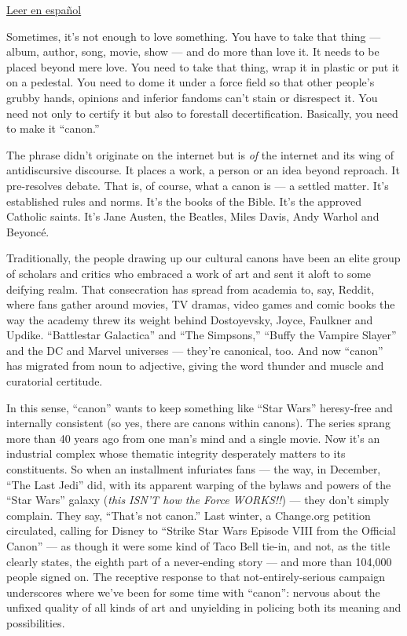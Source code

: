 \href{https://www.nytimes3xbfgragh.onion/es/2018/06/03/fanaticos-canon-arte/}{Leer
en español}

Sometimes, it's not enough to love something. You have to take that
thing --- album, author, song, movie, show --- and do more than love it.
It needs to be placed beyond mere love. You need to take that thing,
wrap it in plastic or put it on a pedestal. You need to dome it under a
force field so that other people's grubby hands, opinions and inferior
fandoms can't stain or disrespect it. You need not only to certify it
but also to forestall decertification. Basically, you need to make it
``canon.''

The phrase didn't originate on the internet but is \emph{of} the
internet and its wing of antidiscursive discourse. It places a work, a
person or an idea beyond reproach. It pre-resolves debate. That is, of
course, what a canon is --- a settled matter. It's established rules and
norms. It's the books of the Bible. It's the approved Catholic saints.
It's Jane Austen, the Beatles, Miles Davis, Andy Warhol and Beyoncé.

Traditionally, the people drawing up our cultural canons have been an
elite group of scholars and critics who embraced a work of art and sent
it aloft to some deifying realm. That consecration has spread from
academia to, say, Reddit, where fans gather around movies, TV dramas,
video games and comic books the way the academy threw its weight behind
Dostoyevsky, Joyce, Faulkner and Updike. ``Battlestar Galactica'' and
``The Simpsons,'' ``Buffy the Vampire Slayer'' and the DC and Marvel
universes --- they're canonical, too. And now ``canon'' has migrated
from noun to adjective, giving the word thunder and muscle and
curatorial certitude.

In this sense, ``canon'' wants to keep something like ``Star Wars''
heresy-free and internally consistent (so yes, there are canons within
canons). The series sprang more than 40 years ago from one man's mind
and a single movie. Now it's an industrial complex whose thematic
integrity desperately matters to its constituents. So when an
installment infuriates fans --- the way, in December, ``The Last Jedi''
did, with its apparent warping of the bylaws and powers of the ``Star
Wars'' galaxy (\emph{this ISN'T how the Force WORKS!!}) --- they don't
simply complain. They say, ``That's not canon.'' Last winter, a
Change.org petition circulated, calling for Disney to ``Strike Star Wars
Episode VIII from the Official Canon'' --- as though it were some kind
of Taco Bell tie-in, and not, as the title clearly states, the eighth
part of a never-ending story --- and more than 104,000 people signed on.
The receptive response to that not-entirely-serious campaign underscores
where we've been for some time with ``canon'': nervous about the unfixed
quality of all kinds of art and unyielding in policing both its meaning
and possibilities.

